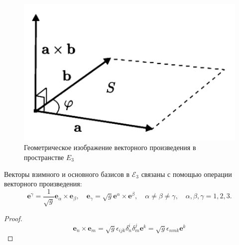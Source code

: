\begin{figure}[ht!]
	\centering
	\includegraphics[width=0.5\linewidth]{img/que5}
	\caption{Геометрическое изображение векторного произведения в пространстве $E_3$}
	\label{fig:que5}
\end{figure}
\begin{theorem}
	Векторы взимного и основного базисов в $\mathcal{E}_3$ связаны с помощью операции векторного произведения:
	\begin{equation*}
		\mathbf{e}^\gamma = \frac{1}{\sqrt{g}}\mathbf{e}_\alpha\times\mathbf{e}_\beta,\quad\mathbf{e}_\gamma=\sqrt{g}\mathbf{e}^\alpha\times\mathbf{e}^\beta,\quad \alpha\neq\beta\neq\gamma,\quad\alpha,\beta,\gamma=1,2,3.
	\end{equation*}
	\begin{proof}
		\begin{equation*}
			\mathbf{e}_n\times\mathbf{e}_m=\sqrt{g}\epsilon_{ijk}\delta^i_n\delta^j_m\mathbf{e}^k=\sqrt{g}\epsilon_{nmk}\mathbf{e}^k
		\end{equation*}
	\end{proof}
\end{theorem}